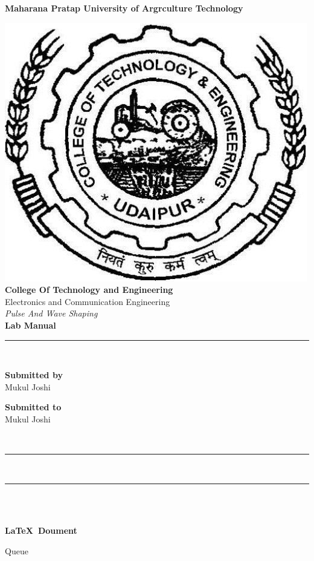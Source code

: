 \documentclass[a4paper,12pt]{report}
\begin{document}
\pagestyle{fancy}
\fancyhf{}
\cfoot{\thepage}
\begin{center}
		\textbf{\Large{Maharana Pratap University of Argrculture
		Technology}}\\[1cm]

\end{center}
\begin{center}
\includegraphics[scale=0.24]{"ctae.jpg"}\\[1.3cm]
		\textbf{\Large College Of Technology and Engineering}\\[1.3cm]
		\large{Electronics and Communication Engineering}\\[1.3cm]
		\textit{Pulse And Wave Shaping}\\[1.3cm]
		\textbf{Lab Manual}\\[1.3cm]
\end{center}
\rule{\linewidth}{.3mm}\\[1cm]
\noindent
\begin{minipage}{0.4\textwidth}
\begin{flushleft}
		\large{\textbf{Submitted by}\\[0.1cm]}
		\large{\textrm{Mukul Joshi}}
\end{flushleft}
\end{minipage}%
\begin{minipage}{0.5\textwidth}
\begin{flushright}
		\large{\textbf{Submitted to}\\[0.1cm]}
		\large{\textrm{Mukul Joshi}}
\end{flushright}
\end{minipage}
\\[1cm]
\rule{\linewidth}{.3mm}\\[0cm]
\rule{\linewidth}{1.4mm}\\[1cm]
\\[1cm]
\thispagestyle{empty}
\begin{center}
		\textbf{\LaTeX\ Doument}\\
\end{center}
\newpage
\begin{center}
	\Large{Queue}\\
\end{center}
\end{document}

